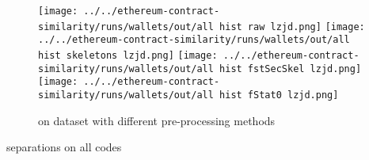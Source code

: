 \documentclass[../main.tex]{subfiles}
\begin{document}
\begin{figure}[ht!]
  \centering
  \texttt{[image: ../../ethereum-contract-similarity/runs/wallets/out/all hist raw lzjd.png]}%
  \texttt{[image: ../../ethereum-contract-similarity/runs/wallets/out/all hist skeletons lzjd.png]}%
  \texttt{[image: ../../ethereum-contract-similarity/runs/wallets/out/all hist fstSecSkel lzjd.png]}%
  \texttt{[image: ../../ethereum-contract-similarity/runs/wallets/out/all hist fStat0 lzjd.png]}%
  \caption{ on  dataset with different pre-processing methods}
  \label{fig:hist_wallets_lzjd}
\end{figure}

\begin{table}[ht!]
  \centering
  \scriptsize %
  \caption{ separations on all  codes}
  \label{tbl:lz_wall_sep}
\end{table}
\end{document}
